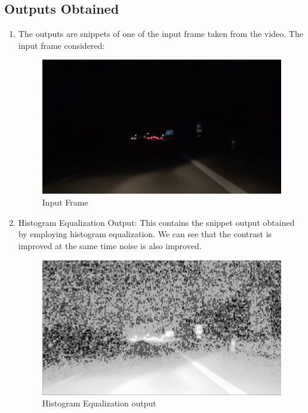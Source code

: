 \documentclass[12pt]{article}
\begin{document}
\subsection{Outputs Obtained}
\begin{enumerate}
\item The outputs are snippets of one of the input frame taken from the video. The input frame considered: 
\begin{figure}[h]
    \centering
    \includegraphics[width=14cm]{inputframe}
    \caption{Input Frame}
    \label{fig:inputframe}
\end{figure}

\item Histogram Equalization Output: This contains the snippet output obtained by employing histogram equalization. We can see that the contrast is improved at the same time noise is also improved.
\begin{figure}[h]
    \centering
    \includegraphics[width=14cm]{histequvideo}
    \caption{Histogram Equalization output}
    \label{fig:histequvideo}
\end{figure}


\end{enumerate}
\end{document}
